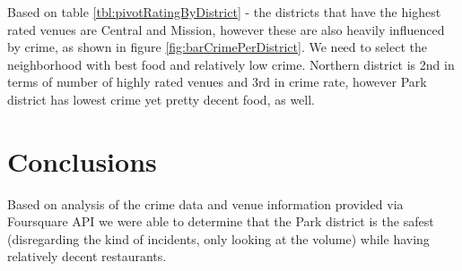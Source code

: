 \documentclass[10pt,parskip=half,
toc=sectionentrywithdots,
bibliography=totocnumbered,
captions=tableheading,numbers=noendperiod]{scrartcl}
\begin{document}
Based on table \ref{tbl:pivotRatingByDistrict} - the districts that have
the highest rated venues are Central and Mission, however these are also
heavily influenced by crime, as shown in figure
\ref{fig:barCrimePerDistrict}. We need to select the neighborhood with
best food and relatively low crime. Northern district is 2nd in terms of
number of highly rated venues and 3rd in crime rate, however Park
district has lowest crime yet pretty decent food, as well.

\hypertarget{conclusions}{%
\section{Conclusions}\label{conclusions}}

Based on analysis of the crime data and venue information provided via
Foursquare API we were able to determine that the Park district is the
safest (disregarding the kind of incidents, only looking at the volume)
while having relatively decent restaurants.
\end{document}
